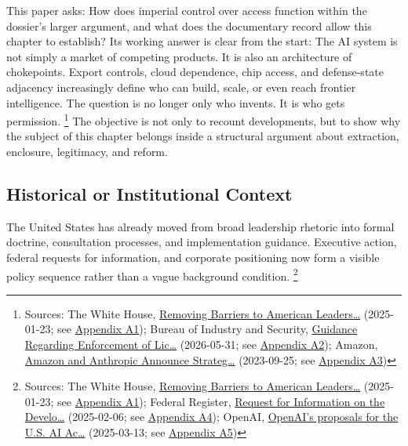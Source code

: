 \documentclass[
  american,
  11pt,
  letterpaper,
]{article}
\begin{document}
This paper asks: How does imperial control over access function within
the dossier's larger argument, and what does the documentary record
allow this chapter to establish? Its working answer is clear from the
start: The AI system is not simply a market of competing products. It is
also an architecture of chokepoints. Export controls, cloud dependence,
chip access, and defense-state adjacency increasingly define who can
build, scale, or even reach frontier intelligence. The question is no
longer only who invents. It is who gets permission. \footnote{Sources:
  The White House,
  \href{https://www.whitehouse.gov/presidential-actions/2025/01/removing-barriers-to-american-leadership-in-artificial-intelligence/}{Removing
  Barriers to American Leaders\ldots{}} (2025-01-23; see
  \hyperref[appendix-a1-removing-barriers-to-american-leadership-in-artificial-intelligence]{Appendix
  A1}); Bureau of Industry and Security,
  \href{https://www.bis.gov/media/documents/bis-guidance-may-31-2026.pdf}{Guidance
  Regarding Enforcement of Lic\ldots{}} (2026-05-31; see
  \hyperref[appendix-a2-guidance-regarding-enforcement-of-license-requirements-for-advanced-computing-items-for-entities-headquartered-in-country-group-d-5-and-macau]{Appendix
  A2}); Amazon,
  \href{https://press.aboutamazon.com/2023/9/amazon-and-anthropic-announce-strategic-collaboration-to-advance-generative-ai}{Amazon
  and Anthropic Announce Strateg\ldots{}} (2023-09-25; see
  \hyperref[appendix-a3-amazon-and-anthropic-announce-strategic-collaboration-to-advance-generative-ai]{Appendix
  A3})} The objective is not only to recount developments, but to show
why the subject of this chapter belongs inside a structural argument
about extraction, enclosure, legitimacy, and reform.

\subsection{Historical or Institutional
Context}\label{historical-or-institutional-context}

The United States has already moved from broad leadership rhetoric into
formal doctrine, consultation processes, and implementation guidance.
Executive action, federal requests for information, and corporate
positioning now form a visible policy sequence rather than a vague
background condition. \footnote{Sources: The White House,
  \href{https://www.whitehouse.gov/presidential-actions/2025/01/removing-barriers-to-american-leadership-in-artificial-intelligence/}{Removing
  Barriers to American Leaders\ldots{}} (2025-01-23; see
  \hyperref[appendix-a1-removing-barriers-to-american-leadership-in-artificial-intelligence]{Appendix
  A1}); Federal Register,
  \href{https://www.federalregister.gov/documents/2025/02/06/2025-02305/request-for-information-on-the-development-of-an-artificial-intelligence-ai-action-plan}{Request
  for Information on the Develo\ldots{}} (2025-02-06; see
  \hyperref[appendix-a4-request-for-information-on-the-development-of-an-artificial-intelligence-ai-action-plan]{Appendix
  A4}); OpenAI,
  \href{https://openai.com/global-affairs/openai-proposals-for-the-us-ai-action-plan/}{OpenAI's
  proposals for the U.S. AI Ac\ldots{}} (2025-03-13; see
  \hyperref[appendix-a5-openais-proposals-for-the-us-ai-action-plan]{Appendix
  A5})}
\end{document}

